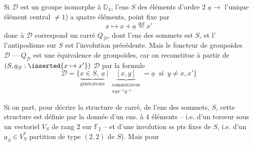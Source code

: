 Si $\mathcal D$ est un groupe isomorphe à $\mathbb D_4$, l'ens $S$ des éléments d'ordre $2$   $\underline a\longrightarrow$ l'unique élément central $\ne1$)  a quatre éléments,    point fixe par
\[
x\longmapsto x+\underline a\overset{\mathrm{def}}=x'
\]
donc à $\mathcal D$ correspond un carré $Q_{\mathcal D}$, dont l'ens des sommets est $S$, et l'  l'antipodisme sur $S$ est l'involution précédente. Mais le foncteur de groupoïdes $\mathcal D\mathrel{\text{---}}Q_{\mathcal D}$
est une équivalence de groupoïdes, car on reconstitue à partir de $(S,\underline a_S:\inserted{x\mapsto x'})$ $\mathcal D$ par  la formule
\[
\mathcal D=\bigl\{\underbrace{x\in S,\ \underline a}_{\text{générateurs}}\ \big|\ 
\underbrace{[x,y]}_{\substack{\text{commutateur}\\xyx^{-1}y^{-1}}}=\underline a\ \text{ si }\ y\ne x,x'\bigr\}
\]


Si on part, pour décrire la structure de carré, de l'ens des sommets, $S$, cette structure est définie par la donnée d'un ens.  à $4$ éléments -- i.e. d'un torseur sous un vectoriel $V_S$ de rang $2$ sur $\mathbb F_2$ -- et d'une  involution ss pts fixes de $S$, i.e. d'un $\underline a_S\in V_S^*$    partition de type $(2,2)$ de $S$). Mais pour



